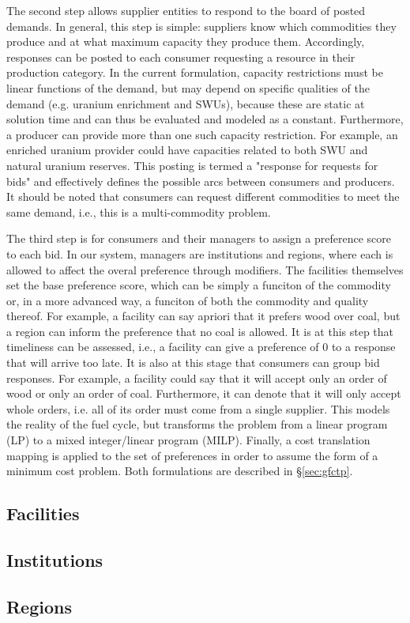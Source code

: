 The second step allows supplier entities to respond to the board of posted
demands. In general, this step is simple: suppliers know which commodities they
produce and at what maximum capacity they produce them. Accordingly, responses
can be posted to each consumer requesting a resource in their production
category. In the current formulation, capacity restrictions must be linear
functions of the demand, but may depend on specific qualities of the demand
(e.g. uranium enrichment and SWUs), because these are static at solution time
and can thus be evaluated and modeled as a constant. Furthermore, a producer can
provide more than one such capacity restriction. For example, an enriched
uranium provider could have capacities related to both SWU and natural uranium
reserves. This posting is termed a "response for requests for bids" and
effectively defines the possible arcs between consumers and producers. It should
be noted that consumers can request different commodities to meet the same
demand, i.e., this is a multi-commodity problem.

The third step is for consumers and their managers to assign a preference score
to each bid. In our system, managers are institutions and regions, where each is
allowed to affect the overal preference through modifiers. The facilities
themselves set the base preference score, which can be simply a funciton of the
commodity or, in a more advanced way, a funciton of both the commodity and
quality thereof. For example, a facility can say apriori that it prefers wood
over coal, but a region can inform the preference that no coal is allowed. It is
at this step that timeliness can be assessed, i.e., a facility can give a
preference of 0 to a response that will arrive too late. It is also at this
stage that consumers can group bid responses. For example, a facility could say
that it will accept only an order of wood or only an order of coal. Furthermore,
it can denote that it will only accept whole orders, i.e. all of its order must
come from a single supplier. This models the reality of the fuel cycle, but
transforms the problem from a linear program (LP) to a mixed integer/linear
program (MILP). Finally, a cost translation mapping is applied to the set of
preferences in order to assume the form of a minimum cost problem. Both
formulations are described in \S\ref{sec:gfctp}.

\subsection{Facilities}

\subsection{Institutions}

\subsection{Regions}
